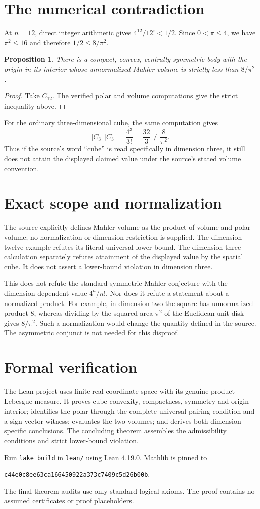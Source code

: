 \documentclass[11pt]{article}
\newtheorem{proposition}{Proposition}
\begin{document}
\section*{The numerical contradiction}
At $n=12$, direct integer arithmetic gives $4^{12}/12!<1/2$. Since $0<\pi\leq4$, we have $\pi^2\leq16$ and therefore $1/2\leq8/\pi^2$.
\begin{proposition}
There is a compact, convex, centrally symmetric body with the origin in its interior whose unnormalized Mahler volume is strictly less than $8/\pi^2$.
\end{proposition}
\begin{proof}
Take $C_{12}$. The verified polar and volume computations give the strict inequality above.
\end{proof}
For the ordinary three-dimensional cube, the same computation gives
\[
 |C_3|\,|C_3^\circ|=\frac{4^3}{3!}=\frac{32}{3}\ne\frac{8}{\pi^2}.
\]
Thus if the source's word ``cube'' is read specifically in dimension three, it still does not attain the displayed claimed value under the source's stated volume convention.

\section*{Exact scope and normalization}
The source explicitly defines Mahler volume as the product of volume and polar volume; no normalization or dimension restriction is supplied. The dimension-twelve example refutes its literal universal lower bound. The dimension-three calculation separately refutes attainment of the displayed value by the spatial cube. It does not assert a lower-bound violation in dimension three.

This does not refute the standard symmetric Mahler conjecture with the dimension-dependent value $4^n/n!$. Nor does it refute a statement about a normalized product. For example, in dimension two the square has unnormalized product $8$, whereas dividing by the squared area $\pi^2$ of the Euclidean unit disk gives $8/\pi^2$. Such a normalization would change the quantity defined in the source. The asymmetric conjunct is not needed for this disproof.

\section*{Formal verification}
The Lean project uses finite real coordinate space with its genuine product Lebesgue measure. It proves cube convexity, compactness, symmetry and origin interior; identifies the polar through the complete universal pairing condition and a sign-vector witness; evaluates the two volumes; and derives both dimension-specific conclusions. The concluding theorem assembles the admissibility conditions and strict lower-bound violation.

Run \texttt{lake build} in \texttt{lean/} using Lean 4.19.0. Mathlib is pinned to
\begin{center}\small\texttt{c44e0c8ee63ca166450922a373c7409c5d26b00b}.\end{center}
The final theorem audits use only standard logical axioms. The proof contains no assumed certificates or proof placeholders.
\end{document}
